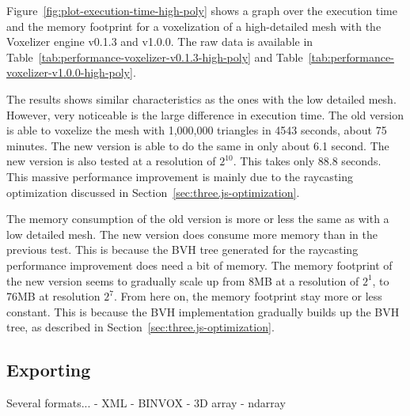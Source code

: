 Figure~\ref{fig:plot-execution-time-high-poly} shows a graph over the execution time and the memory footprint for a voxelization of a high-detailed mesh with the Voxelizer engine v0.1.3 and v1.0.0. The raw data is available in Table~\ref{tab:performance-voxelizer-v0.1.3-high-poly} and Table~\ref{tab:performance-voxelizer-v1.0.0-high-poly}.

The results shows similar characteristics as the ones with the low detailed mesh. However, very noticeable is the large difference in execution time. The old version is able to voxelize the mesh with 1,000,000 triangles in 4543 seconds, about 75 minutes. The new version is able to do the same in only about 6.1 second. The new version is also tested at a resolution of $2^10$. This takes only 88.8 seconds. This massive performance improvement is mainly due to the raycasting optimization discussed in Section~\ref{sec:three.js-optimization}.

The memory consumption of the old version is more or less the same as with a low detailed mesh. The new version does consume more memory than in the previous test. This is because the BVH tree generated for the raycasting performance improvement does need a bit of memory. The memory footprint of the new version seems to gradually scale up from 8MB at a resolution of $2^1$, to 76MB at resolution $2^7$. From here on, the memory footprint stay more or less constant. This is because the BVH implementation gradually builds up the BVH tree, as described in Section~\ref{sec:three.js-optimization}.

\subsection{Exporting}
Several formats...
- XML
- BINVOX
- 3D array
- ndarray

